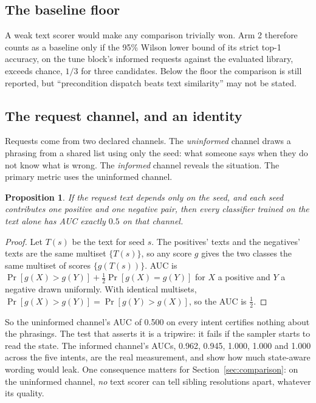 \documentclass[11pt]{article}
\newtheorem{proposition}{Proposition}
\begin{document}
\subsection{The baseline floor}

A weak text scorer would make any comparison trivially won. Arm 2 therefore counts as a baseline
only if the 95\% Wilson lower bound of its strict top-1 accuracy, on the tune block's informed
requests against the evaluated library, exceeds chance, $1/3$ for three candidates. Below the
floor the comparison is still reported, but ``precondition dispatch beats text similarity'' may
not be stated.

\subsection{The request channel, and an identity}
\label{sec:identity}

Requests come from two declared channels. The \emph{uninformed} channel draws a phrasing from a
shared list using only the seed: what someone says when they do not know what is wrong. The
\emph{informed} channel reveals the situation. The primary metric uses the uninformed channel.

\begin{proposition}
If the request text depends only on the seed, and each seed contributes one positive and one
negative pair, then every classifier trained on the text alone has AUC exactly $0.5$ on that
channel.
\end{proposition}

\begin{proof}
Let $T(s)$ be the text for seed $s$. The positives' texts and the negatives' texts are the same
multiset $\{T(s)\}$, so any score $g$ gives the two classes the same multiset of scores
$\{g(T(s))\}$. AUC is $\Pr[g(X)>g(Y)]+\tfrac12\Pr[g(X)=g(Y)]$ for $X$ a positive and $Y$ a
negative drawn uniformly. With identical multisets, $\Pr[g(X)>g(Y)]=\Pr[g(Y)>g(X)]$, so the AUC
is $\tfrac12$.
\end{proof}

So the uninformed channel's AUC of 0.500 on every intent certifies nothing about the phrasings.
The test that asserts it is a tripwire: it fails if the sampler starts to read the state. The
informed channel's AUCs, 0.962, 0.945, 1.000, 1.000 and 1.000 across the five intents, are the
real measurement, and show how much state-aware wording would leak. One consequence matters for
Section~\ref{sec:comparison}: on the uninformed channel, \emph{no} text scorer can tell sibling
resolutions apart, whatever its quality.
\end{document}
